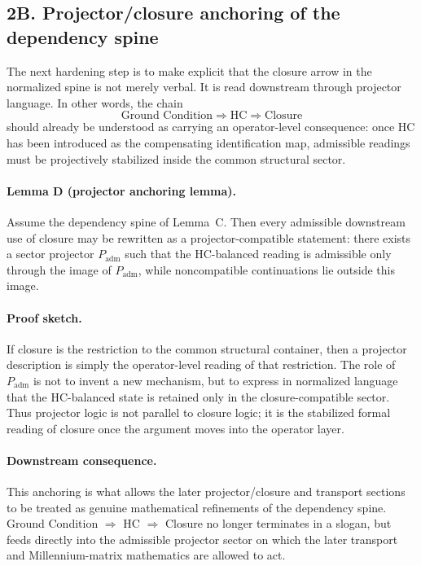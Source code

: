 \subsection*{2B. Projector/closure anchoring of the dependency spine}
The next hardening step is to make explicit that the closure arrow in the
normalized spine is not merely verbal. It is read downstream through projector
language. In other words, the chain
\[
\text{Ground Condition} \Longrightarrow \text{HC} \Longrightarrow \text{Closure}
\]
should already be understood as carrying an operator-level consequence: once HC
has been introduced as the compensating identification map, admissible readings
must be projectively stabilized inside the common structural sector.

\paragraph{Lemma D (projector anchoring lemma).}
Assume the dependency spine of Lemma~C. Then every admissible downstream use of
closure may be rewritten as a projector-compatible statement: there exists a
sector projector $P_{\mathrm{adm}}$ such that the HC-balanced reading is
admissible only through the image of $P_{\mathrm{adm}}$, while noncompatible
continuations lie outside this image.

\paragraph{Proof sketch.}
If closure is the restriction to the common structural container, then a
projector description is simply the operator-level reading of that restriction.
The role of $P_{\mathrm{adm}}$ is not to invent a new mechanism, but to express
in normalized language that the HC-balanced state is retained only in the
closure-compatible sector. Thus projector logic is not parallel to closure
logic; it is the stabilized formal reading of closure once the argument moves
into the operator layer.

\paragraph{Downstream consequence.}
This anchoring is what allows the later projector/closure and transport sections
to be treated as genuine mathematical refinements of the dependency spine.
Ground Condition $\Rightarrow$ HC $\Rightarrow$ Closure no longer terminates in
a slogan, but feeds directly into the admissible projector sector on which the
later transport and Millennium-matrix mathematics are allowed to act.

